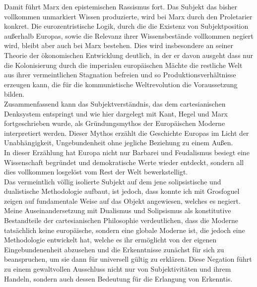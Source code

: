 \noindent Damit führt Marx den epistemischen Rassismus fort. Das Subjekt das bisher
vollkommen unmarkiert Wissen produzierte, wird bei Marx durch den Proletarier
konkret. Die eurozentristische Logik, durch die die Existenz von
Subjektposition außerhalb Europas, sowie die Relevanz ihrer Wissensbestände
vollkommen negiert wird, bleibt aber auch bei Marx bestehen.\footnotemark {}  Dies wird
insbesondere an seiner Theorie der ökonomischen Entwicklung deutlich, in der er
davon ausgeht dass nur die Kolonisierung durch die imperialen europäischen
Mächte die restliche Welt aus ihrer vermeintlichen Stagnation befreien und so
Produktionsverhältnisse erzeugen kann, die für die kommunistische
Weltrevolution die Voraussetzung bilden.\\

\noindent Zusammenfassend kann das Subjektverständnis, das dem cartesianischen Denksystem
entspringt und wie hier dargelegt mit Kant, Hegel und Marx fortgeschrieben
wurde, als Gründungsmythos der Europäischen Moderne interpretiert werden.\footnotemark {} 
Dieser Mythos erzählt die Geschichte Europas im Licht der Unabhängigkeit,
Ungebundenheit ohne jegliche Beziehung zu einem Außen.\\
 In dieser Erzählung hat
Europa nicht nur Barbarei und Feudalismus besiegt eine Wissenschaft begründet
und demokratische Werte wieder entdeckt, sondern all dies vollkommen losgelöst
vom Rest der Welt bewerkstelligt.\footnotemark {}\\
 Das vermeintlich völlig isolierte Subjekt
auf dem jene solipsistische und dualistische Methodologie aufbaut, ist jedoch,
dass konnte ich mit Grosfoguel zeigen auf fundamentale Weise auf das Objekt
angewiesen, welches es negiert. Meine Auseinandersetzung mit Dualismus und
Solipsismus als konstitutive Bestandteile der cartesianischen Philosophie
verdeutlichen, dass die Moderne tatsächlich keine europäische, sondern eine
globale Moderne ist, die jedoch eine Methodologie entwickelt hat, welche es ihr
ermöglicht von der eigenen Eingebundenenheit abzusehen und die Erkenntnisse
zunächst für sich zu beanspruchen, um sie dann für universell gültig zu
erklären. Diese Negation führt zu einem gewaltvollen Ausschluss nicht nur von
Subjektivitäten und ihrem Handeln, sondern auch dessen Bedeutung für die
Erlangung von Erkenntis.\\

